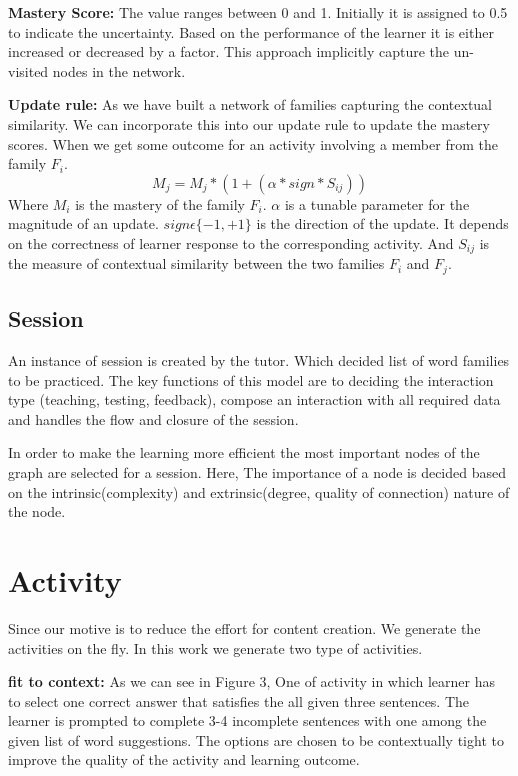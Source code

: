 \documentclass[11pt,a4paper]{article}
\begin{document}
\textbf{Mastery Score:} The value ranges between 0 and 1. Initially it is
assigned to 0.5 to indicate the uncertainty. Based on the performance of the
learner it is either increased or decreased by a factor. This approach implicitly
capture the un-visited nodes in the network.

\textbf{Update rule:} As we have built a network of families capturing the
contextual similarity. We can incorporate this into our update rule to update
the mastery scores. When we get some outcome for an activity involving a member
from the family ${F_i}$.
\begin{equation}
  M_j = M_j * (1 + (\alpha * sign * S_{ij}))
\end{equation}
Where ${M_i}$ is the mastery of the family ${F_i}$. ${\alpha}$ is a tunable parameter
for the magnitude of an update. ${sign \epsilon  \{-1, +1\}}$ is the direction 
of the update. It depends on the correctness of learner response to the corresponding
activity. And ${S_{ij}}$ is the measure of contextual similarity between the two
families ${F_i}$ and ${F_j}$.

\subsection{Session}
An instance of session is created by the tutor. Which decided list of word
families to be practiced. The key functions of this model are to deciding the
interaction type (teaching, testing, feedback), compose an interaction with all
required data and handles the flow and closure of the session.

In order to make the learning more efficient the most important nodes of the
graph are selected for a session. Here, The importance of a node is decided
based on the intrinsic(complexity) and extrinsic(degree, quality of connection)
nature of the node.


\section{Activity}
\label{sec:activity}

Since our motive is to reduce the effort for content creation. We generate the
activities on the fly. In this work we generate two type of activities. 

\textbf{fit to context:} As we can see in  Figure 3, One of activity in which learner has to select one correct answer that satisfies the all given three sentences. The learner is prompted to complete 3-4 incomplete
sentences with one among the given list of word suggestions. The options are
chosen to be contextually tight to improve the quality of the activity and
learning outcome.
\end{document}
